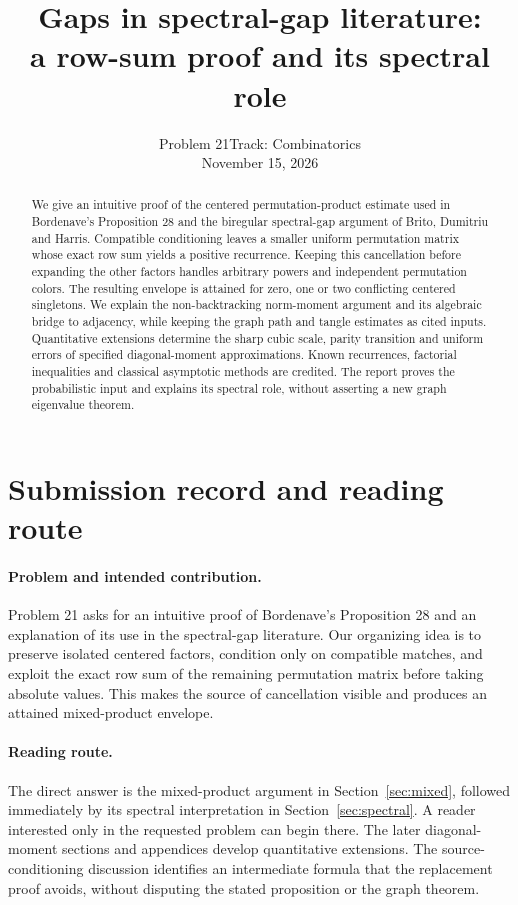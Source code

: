 \documentclass[11pt]{article}
\title{Gaps in spectral-gap literature:\\ a row-sum proof and its spectral role}
\author{}
\date{Problem 21\quad Track: Combinatorics\\November 15, 2026}
\theoremstyle{definition}
\theoremstyle{remark}
\newcommand{\1}{\mathbf 1}
\begin{document}
\maketitle
\begin{abstract}
We give an intuitive proof of the centered permutation-product estimate used in Bordenave's Proposition 28 and the biregular spectral-gap argument of Brito, Dumitriu and Harris. Compatible conditioning leaves a smaller uniform permutation matrix whose exact row sum yields a positive recurrence. Keeping this cancellation before expanding the other factors handles arbitrary powers and independent permutation colors. The resulting envelope is attained for zero, one or two conflicting centered singletons. We explain the non-backtracking norm-moment argument and its algebraic bridge to adjacency, while keeping the graph path and tangle estimates as cited inputs. Quantitative extensions determine the sharp cubic scale, parity transition and uniform errors of specified diagonal-moment approximations. Known recurrences, factorial inequalities and classical asymptotic methods are credited. The report proves the probabilistic input and explains its spectral role, without asserting a new graph eigenvalue theorem.
\end{abstract}
\section*{Submission record and reading route}

\paragraph{Problem and intended contribution.}
Problem 21 asks for an intuitive proof of Bordenave's Proposition 28 and an explanation of its use in the spectral-gap literature. Our organizing idea is to preserve isolated centered factors, condition only on compatible matches, and exploit the exact row sum of the remaining permutation matrix before taking absolute values. This makes the source of cancellation visible and produces an attained mixed-product envelope.

\paragraph{Reading route.}
The direct answer is the mixed-product argument in Section~\ref{sec:mixed}, followed immediately by its spectral interpretation in Section~\ref{sec:spectral}. A reader interested only in the requested problem can begin there. The later diagonal-moment sections and appendices develop quantitative extensions. The source-conditioning discussion identifies an intermediate formula that the replacement proof avoids, without disputing the stated proposition or the graph theorem.
\end{document}
